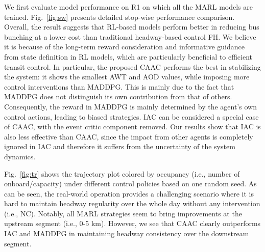\documentclass{article}
\begin{document}
We first evaluate model performance on R1 on which all the MARL models are trained. Fig.~\ref{fig:sw} presents detailed stop-wise performance comparison. Overall, the result suggests that RL-based models perform better in reducing bus bunching at a lower cost than traditional headway-based control FH. We believe it is because of the long-term reward consideration and informative guidance from state definition in RL models, which are particularly beneficial to efficient transit control. In particular, the proposed CAAC performs the best in stabilizing the system: it shows the smallest AWT and AOD values, while imposing more control interventions than MADDPG. This is mainly due to the fact that MADDPG does not distinguish its own contribution from that of others. Consequently, the reward in MADDPG is mainly determined by the agent's own control actions, leading to biased strategies. IAC can be considered a special case of CAAC, with the event critic component removed. Our results show that IAC is also less effective than CAAC, since the impact from other agents is completely ignored in IAC and therefore it suffers from the uncertainty of the system dynamics.



Fig.~\ref{fig:tr} shows the trajectory plot colored by occupancy (i.e., number of onboard/capacity) under different control policies based on one random seed. As can be seen, the real-world operation provides a challenging scenario where it is hard to maintain headway regularity over the whole day without any intervention (i.e., NC). Notably, all MARL strategies seem to bring improvements at the upstream segment (i.e., 0-5 km). However, we see that CAAC clearly outperforms IAC and MADDPG in maintaining headway consistency over the downstream segment.
\end{document}
